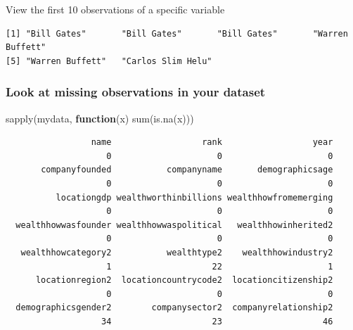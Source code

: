 \documentclass[
]{book}
\newenvironment{Shaded}{\begin{snugshade}}{\end{snugshade}}
\newcommand{\ControlFlowTok}[1]{\textcolor[rgb]{0.13,0.29,0.53}{\textbf{#1}}}
\newcommand{\FunctionTok}[1]{\textcolor[rgb]{0.00,0.00,0.00}{#1}}
\newcommand{\NormalTok}[1]{#1}
\newcommand{\SpecialCharTok}[1]{\textcolor[rgb]{0.00,0.00,0.00}{#1}}
\begin{document}
View the first 10 observations of a specific variable

\begin{Shaded}
\end{Shaded}

\begin{verbatim}
[1] "Bill Gates"       "Bill Gates"       "Bill Gates"       "Warren Buffett"  
[5] "Warren Buffett"   "Carlos Slim Helu"
\end{verbatim}

\hypertarget{missing}{%
\subsubsection*{Look at missing observations in your dataset}\label{missing}}

\begin{Shaded}
\begin{Highlighting}[]
\FunctionTok{sapply}\NormalTok{(mydata, }\ControlFlowTok{function}\NormalTok{(x) }\FunctionTok{sum}\NormalTok{(}\FunctionTok{is.na}\NormalTok{(x)))}
\end{Highlighting}
\end{Shaded}

\begin{verbatim}
                 name                  rank                  year 
                    0                     0                     0 
       companyfounded           companyname       demographicsage 
                    0                     0                     0 
          locationgdp wealthworthinbillions wealthhowfromemerging 
                    0                     0                     0 
  wealthhowwasfounder wealthhowwaspolitical   wealthhowinherited2 
                    0                     0                     0 
   wealthhowcategory2           wealthtype2    wealthhowindustry2 
                    1                    22                     1 
      locationregion2  locationcountrycode2  locationcitizenship2 
                    0                     0                     0 
  demographicsgender2        companysector2  companyrelationship2 
                   34                    23                    46 
\end{verbatim}
\end{document}

